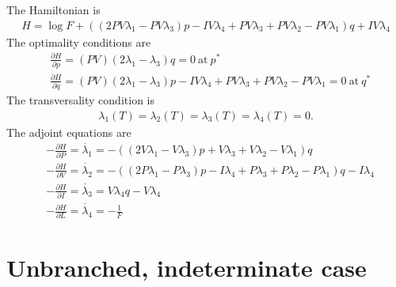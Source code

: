 \documentclass[12pt, oneside]{article}   	%
\begin{document}
%
\noindent The Hamiltonian is 
%
\begin{align}
H = \log F +
((2PV \lambda_1-PV \lambda_3 )p-IV \lambda_4+PV \lambda_3+PV \lambda_2-PV \lambda_1)q+IV \lambda_4
\end{align}
%
The optimality conditions are
%
\begin{align}
& \frac{\partial H}{\partial p} = (PV)( 2\lambda_1 - \lambda_3)q = 0\ \mathrm{at}\ p^* \\
&\frac{\partial H}{\partial q} =  (PV) ( 2\lambda_1- \lambda_3)p-IV \lambda_4+PV \lambda_3+PV \lambda_2-PV \lambda_1 = 0\ \mathrm{at}\ q^* 
\end{align}
%
The transversality condition is
%
\begin{align}
\lambda_1(T) = \lambda_2(T) = \lambda_3(T) = \lambda_4(T) = 0.
\end{align}
%
The adjoint equations are
%
\begin{align}
&-\frac{\partial H}{\partial P} = \dot{\lambda_1}  = -((2 V \lambda_1-V \lambda_3)p+V \lambda_3+V \lambda_2-V \lambda_1)q \nonumber \\
&-\frac{\partial H}{\partial V} = \dot{\lambda_2}  = -((2 P \lambda_1-P \lambda_3)p-I \lambda_4+P \lambda_3+P \lambda_2-P \lambda_1)q-I \lambda_4  \nonumber\\
&-\frac{\partial H}{\partial I} = \dot{\lambda_3}  = V \lambda_4q-V \lambda_4 \nonumber \\
&-\frac{\partial H}{\partial L} = \dot{\lambda_4}  = -\frac{1}{F}  
\end{align}

\clearpage
\newpage


\section*{Unbranched, indeterminate case}
\end{document}
